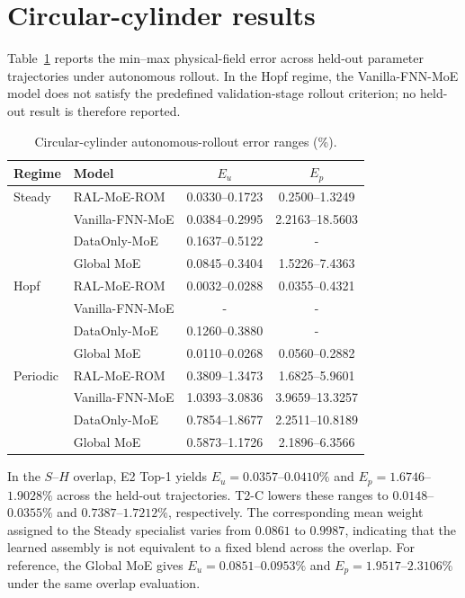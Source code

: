 \section{Circular-cylinder results}
\label{app:circular}

Table~\ref{tab:circular_full} reports the min--max physical-field error across held-out parameter trajectories under autonomous rollout. In the Hopf regime, the Vanilla-FNN-MoE model does not satisfy the predefined validation-stage rollout criterion; no held-out result is therefore reported.

\par
\begin{table}[H]
\centering
\caption{Circular-cylinder autonomous-rollout error ranges (\%). }
\label{tab:circular_full}
\small
\setlength{\tabcolsep}{4pt}
\begin{tabular}{llcc}
\toprule
Regime & Model & $E_u$ & $E_p$ \\
\midrule
Steady & RAL-MoE-ROM & 0.0330--0.1723 & 0.2500--1.3249 \\
 & Vanilla-FNN-MoE & 0.0384--0.2995 & 2.2163--18.5603 \\
 & DataOnly-MoE & 0.1637--0.5122 & - \\
 & Global MoE & 0.0845--0.3404 & 1.5226--7.4363 \\
\midrule
Hopf & RAL-MoE-ROM & 0.0032--0.0288 & 0.0355--0.4321 \\
 & Vanilla-FNN-MoE & - & -  \\
 & DataOnly-MoE & 0.1260--0.3880 & - \\
 & Global MoE & 0.0110--0.0268 & 0.0560--0.2882 \\
\midrule
Periodic & RAL-MoE-ROM & 0.3809--1.3473 & 1.6825--5.9601 \\
 & Vanilla-FNN-MoE & 1.0393--3.0836 & 3.9659--13.3257 \\
 & DataOnly-MoE & 0.7854--1.8677 & 2.2511--10.8189 \\
 & Global MoE & 0.5873--1.1726 & 2.1896--6.3566 \\
\bottomrule
\end{tabular}
\end{table}
\par

In the $S$--$H$ overlap, E2 Top-1 yields $E_u=0.0357$--$0.0410\%$ and
$E_p=1.6746$--$1.9028\%$ across the held-out trajectories. T2-C lowers these ranges to $0.0148$--$0.0355\%$ and $0.7387$--$1.7212\%$, respectively. The corresponding mean weight assigned to the Steady specialist varies from $0.0861$ to $0.9987$, indicating that the learned assembly is not equivalent to a fixed blend across the overlap. For reference, the Global MoE gives $E_u=0.0851$--$0.0953\%$ and $E_p=1.9517$--$2.3106\%$ under the same overlap evaluation.
